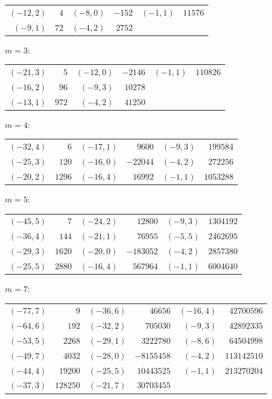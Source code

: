 {\small\begin{tabular}{@{}r@{\ \ }r@{\qquad}r@{\ \ }r@{\qquad}r@{\ \ }r@{}}
$(-12,2)$ & $4$ & $(-8,0)$ & $-152$ & $(-1,1)$ & $11576$ \\
$(-9,1)$ & $72$ & $(-4,2)$ & $2752$ & & \\
\end{tabular}}\par\medskip
\noindent$m=3$:\nopagebreak\\[2pt]
{\small\begin{tabular}{@{}r@{\ \ }r@{\qquad}r@{\ \ }r@{\qquad}r@{\ \ }r@{}}
$(-21,3)$ & $5$ & $(-12,0)$ & $-2146$ & $(-1,1)$ & $110826$ \\
$(-16,2)$ & $96$ & $(-9,3)$ & $10278$ & & \\
$(-13,1)$ & $972$ & $(-4,2)$ & $41250$ & & \\
\end{tabular}}\par\medskip
\noindent$m=4$:\nopagebreak\\[2pt]
{\small\begin{tabular}{@{}r@{\ \ }r@{\qquad}r@{\ \ }r@{\qquad}r@{\ \ }r@{}}
$(-32,4)$ & $6$ & $(-17,1)$ & $9600$ & $(-9,3)$ & $199584$ \\
$(-25,3)$ & $120$ & $(-16,0)$ & $-22044$ & $(-4,2)$ & $272256$ \\
$(-20,2)$ & $1296$ & $(-16,4)$ & $16992$ & $(-1,1)$ & $1053288$ \\
\end{tabular}}\par\medskip
\noindent$m=5$:\nopagebreak\\[2pt]
{\small\begin{tabular}{@{}r@{\ \ }r@{\qquad}r@{\ \ }r@{\qquad}r@{\ \ }r@{}}
$(-45,5)$ & $7$ & $(-24,2)$ & $12800$ & $(-9,3)$ & $1304192$ \\
$(-36,4)$ & $144$ & $(-21,1)$ & $76955$ & $(-5,5)$ & $2462695$ \\
$(-29,3)$ & $1620$ & $(-20,0)$ & $-183052$ & $(-4,2)$ & $2857380$ \\
$(-25,5)$ & $2880$ & $(-16,4)$ & $567964$ & $(-1,1)$ & $6004640$ \\
\end{tabular}}\par\medskip
\noindent$m=7$:\nopagebreak\\[2pt]
{\small\begin{tabular}{@{}r@{\ \ }r@{\qquad}r@{\ \ }r@{\qquad}r@{\ \ }r@{}}
$(-77,7)$ & $9$ & $(-36,6)$ & $46656$ & $(-16,4)$ & $42700596$ \\
$(-64,6)$ & $192$ & $(-32,2)$ & $705030$ & $(-9,3)$ & $42892335$ \\
$(-53,5)$ & $2268$ & $(-29,1)$ & $3222780$ & $(-8,6)$ & $64504998$ \\
$(-49,7)$ & $4032$ & $(-28,0)$ & $-8155458$ & $(-4,2)$ & $113142510$ \\
$(-44,4)$ & $19200$ & $(-25,5)$ & $10443525$ & $(-1,1)$ & $213270204$ \\
$(-37,3)$ & $128250$ & $(-21,7)$ & $30703455$ & & \\
\end{tabular}}\par\medskip

